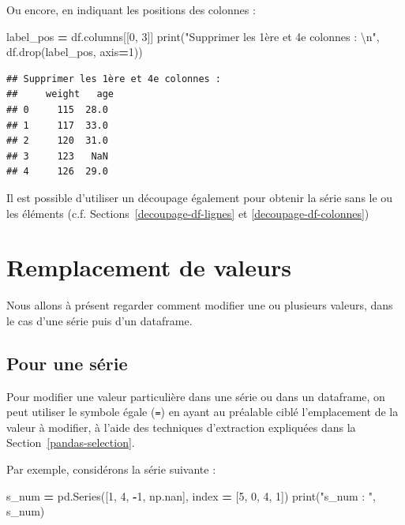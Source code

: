 \documentclass[12pt,]{book}
\newenvironment{Shaded}{\begin{snugshade}}{\end{snugshade}}
\newcommand{\DecValTok}[1]{\textcolor[rgb]{0.00,0.00,0.81}{#1}}
\newcommand{\CharTok}[1]{\textcolor[rgb]{0.31,0.60,0.02}{#1}}
\newcommand{\StringTok}[1]{\textcolor[rgb]{0.31,0.60,0.02}{#1}}
\newcommand{\OperatorTok}[1]{\textcolor[rgb]{0.81,0.36,0.00}{\textbf{#1}}}
\newcommand{\BuiltInTok}[1]{#1}
\newcommand{\NormalTok}[1]{#1}
\numberwithin{equation}{section}
\numberwithin{countremarque}{section}
\begin{document}
Ou encore, en indiquant les positions des colonnes :

\begin{Shaded}
\begin{Highlighting}[]
\NormalTok{label_pos }\OperatorTok{=}\NormalTok{ df.columns[[}\DecValTok{0}\NormalTok{, }\DecValTok{3}\NormalTok{]]}
\BuiltInTok{print}\NormalTok{(}\StringTok{"Supprimer les 1ère et 4e colonnes :  }\CharTok{\textbackslash{}n}\StringTok{"}\NormalTok{, df.drop(label_pos, axis}\OperatorTok{=}\DecValTok{1}\NormalTok{))}
\end{Highlighting}
\end{Shaded}

\begin{lstlisting}
## Supprimer les 1ère et 4e colonnes :  
##     weight   age
## 0     115  28.0
## 1     117  33.0
## 2     120  31.0
## 3     123   NaN
## 4     126  29.0
\end{lstlisting}

Il est possible d'utiliser un découpage également pour obtenir la série
sans le ou les éléments (c.f. Sections~\ref{decoupage-df-lignes} et
\ref{decoupage-df-colonnes})

\section{Remplacement de valeurs}\label{remplacement-de-valeurs}

Nous allons à présent regarder comment modifier une ou plusieurs
valeurs, dans le cas d'une série puis d'un dataframe.

\subsection{Pour une série}\label{pour-une-serie}

Pour modifier une valeur particulière dans une série ou dans un
dataframe, on peut utiliser le symbole égale (\texttt{=}) en ayant au
préalable ciblé l'emplacement de la valeur à modifier, à l'aide des
techniques d'extraction expliquées dans la
Section~\ref{pandas-selection}.

Par exemple, considérons la série suivante :

\begin{Shaded}
\begin{Highlighting}[]
\NormalTok{s_num }\OperatorTok{=}\NormalTok{ pd.Series([}\DecValTok{1}\NormalTok{, }\DecValTok{4}\NormalTok{, }\OperatorTok{-}\DecValTok{1}\NormalTok{, np.nan],}
\NormalTok{             index }\OperatorTok{=}\NormalTok{ [}\DecValTok{5}\NormalTok{, }\DecValTok{0}\NormalTok{, }\DecValTok{4}\NormalTok{, }\DecValTok{1}\NormalTok{])}
\BuiltInTok{print}\NormalTok{(}\StringTok{"s_num : "}\NormalTok{, s_num)}
\end{Highlighting}
\end{Shaded}
\end{document}
